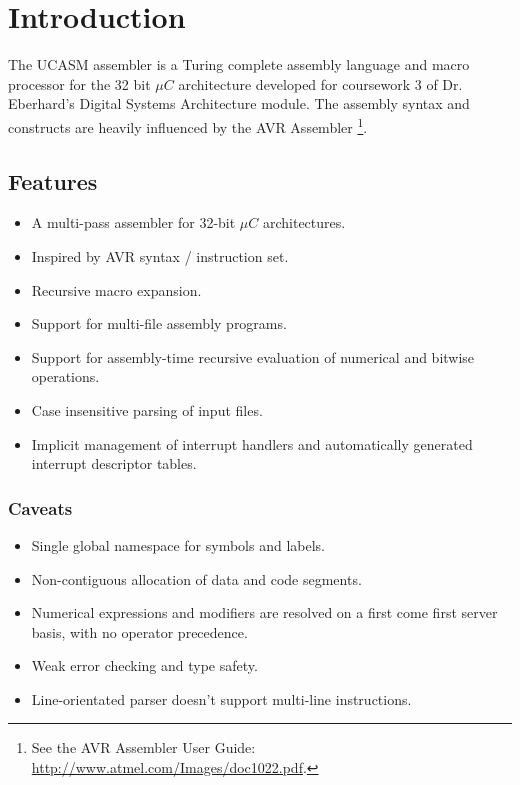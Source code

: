 \documentclass[12pt,twoside]{report}
\begin{document}



\tableofcontents

\newpage


\chapter{Introduction}

The UCASM assembler is a Turing complete assembly language and macro
processor for the 32 bit $\mu C$ architecture developed for coursework
3 of Dr. Eberhard's Digital Systems Architecture module. The assembly
syntax and constructs are heavily influenced by the AVR Assembler
\footnote{See the AVR Assembler User Guide:
  \url{http://www.atmel.com/Images/doc1022.pdf}.}.

\section{Features}

\begin{itemize}
\item A multi-pass assembler for 32-bit $\mu C$ architectures.
\item Inspired by AVR syntax / instruction set.
\item Recursive macro expansion.
\item Support for multi-file assembly programs.
\item Support for assembly-time recursive evaluation of numerical and
  bitwise operations.
\item Case insensitive parsing of input files.
\item Implicit management of interrupt handlers and automatically
  generated interrupt descriptor tables.
\end{itemize}

\subsection{Caveats}

\begin{itemize}
\item Single global namespace for symbols and labels.
\item Non-contiguous allocation of data and code segments.
\item Numerical expressions and modifiers are resolved on a first come
  first server basis, with no operator precedence.
\item Weak error checking and type safety.
\item Line-orientated parser doesn't support multi-line instructions.
\end{itemize}
\end{document}
